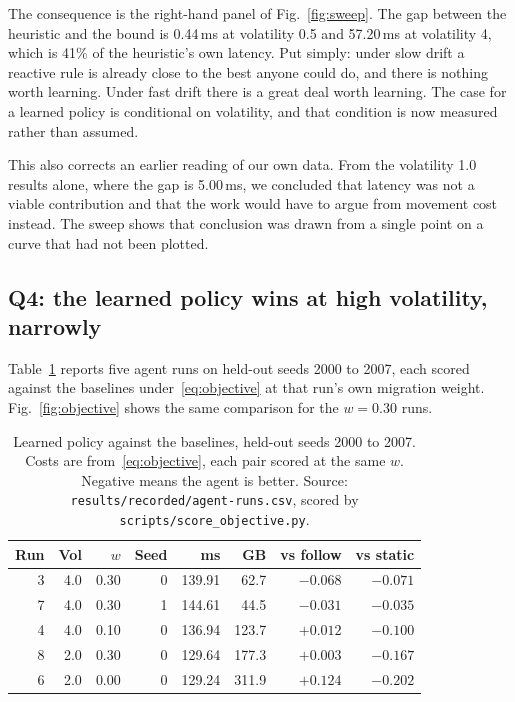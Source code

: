 The consequence is the right-hand panel of Fig.~\ref{fig:sweep}. The gap
between the heuristic and the bound is 0.44\,ms at volatility 0.5 and
57.20\,ms at volatility 4, which is 41\% of the heuristic's own latency.
Put simply: under slow drift a reactive rule is already close to the best
anyone could do, and there is nothing worth learning. Under fast drift
there is a great deal worth learning. The case for a learned policy is
conditional on volatility, and that condition is now measured rather than
assumed.

This also corrects an earlier reading of our own data. From the volatility
1.0 results alone, where the gap is 5.00\,ms, we concluded that latency was
not a viable contribution and that the work would have to argue from
movement cost instead. The sweep shows that conclusion was drawn from a
single point on a curve that had not been plotted.

\subsection{Q4: the learned policy wins at high volatility, narrowly}

Table~\ref{tab:agent} reports five agent runs on held-out seeds 2000 to
2007, each scored against the baselines under~\eqref{eq:objective} at that
run's own migration weight. Fig.~\ref{fig:objective} shows the same
comparison for the $w=0.30$ runs.

\begin{table}[t]
\caption{Learned policy against the baselines, held-out seeds 2000 to 2007.
Costs are from~\eqref{eq:objective}, each pair scored at the same $w$.
Negative means the agent is better. Source:
\texttt{results/recorded/agent-runs.csv}, scored by
\texttt{scripts/score\_objective.py}.}
\label{tab:agent}
\centering
\small
\begin{tabular}{rrrrrrrr}
\toprule
Run & Vol & $w$ & Seed & ms & GB & vs follow & vs static \\
\midrule
3 & 4.0 & 0.30 & 0 & 139.91 &  62.7 & $-0.068$ & $-0.071$ \\
7 & 4.0 & 0.30 & 1 & 144.61 &  44.5 & $-0.031$ & $-0.035$ \\
4 & 4.0 & 0.10 & 0 & 136.94 & 123.7 & $+0.012$ & $-0.100$ \\
8 & 2.0 & 0.30 & 0 & 129.64 & 177.3 & $+0.003$ & $-0.167$ \\
6 & 2.0 & 0.00 & 0 & 129.24 & 311.9 & $+0.124$ & $-0.202$ \\
\bottomrule
\end{tabular}
\end{table}

